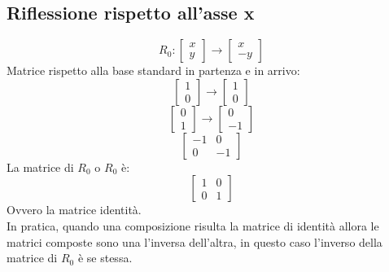 \documentclass[12pt,a4paper]{article}
\begin{document}
\subsection{Riflessione rispetto all'asse x}
\[R_0: 
\begin{bmatrix}
  x\\
  y
\end{bmatrix} \to \begin{bmatrix}
  x\\
  -y
\end{bmatrix}
\]
Matrice rispetto alla base standard in partenza e in arrivo:
\[
\begin{bmatrix}
  1\\
  0
\end{bmatrix} \to \begin{bmatrix}
  1\\
  0
\end{bmatrix}
\]
\[
\begin{bmatrix}
  0\\
  1
\end{bmatrix} \to \begin{bmatrix}
  0\\
  -1
\end{bmatrix}
\]
\[
\begin{bmatrix}
  -1 & 0\\
  0 & -1 
\end{bmatrix}
\]
La matrice di $R_0$ o $R_0$ è:
\[
\begin{bmatrix}
  1 & 0\\
  0 & 1
\end{bmatrix}
\]
Ovvero la matrice identità.\\
In pratica, quando una composizione risulta la matrice di identità allora le matrici composte sono una l'inversa dell'altra, in questo caso l'inverso della matrice di $R_0$ è se stessa.
\end{document}
